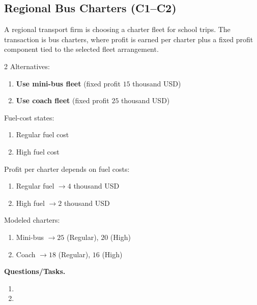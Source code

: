 	\subsection{Regional Bus Charters (C1--C2)}
	\label{sec:problem20-regional-bus-charters-c1-c2}
	A regional transport firm is choosing a charter fleet for school trips. The transaction is bus charters, where profit is earned per charter plus a fixed profit component tied to the selected fleet arrangement.
	
	\begin{multicols}{2}
		Alternatives:
		\begin{enumerate}[label=\arabic*.]
			\item \textbf{Use mini-bus fleet} (fixed profit $15$ thousand USD)
			\item \textbf{Use coach fleet} (fixed profit $25$ thousand USD)
		\end{enumerate}
	
		Fuel-cost states:
		\begin{enumerate}[label=\arabic*.]
			\item Regular fuel cost
			\item High fuel cost
		\end{enumerate}
	
			\columnbreak
	
		Profit per charter depends on fuel costs:
		\begin{enumerate}[label=\arabic*.]
			\item Regular fuel $\to 4$ thousand USD
			\item High fuel $\to 2$ thousand USD
		\end{enumerate}
	
		Modeled charters:
		\begin{enumerate}[label=\arabic*.]
			\item Mini-bus $\to 25$ (Regular), $20$ (High)
			\item Coach $\to 18$ (Regular), $16$ (High)
		\end{enumerate}
	\end{multicols}

	\textbf{Questions/Tasks.}
	\begin{enumerate}[label=\textbf{\alph*)}]
		\item {}
		\item {}
	\end{enumerate}
	
